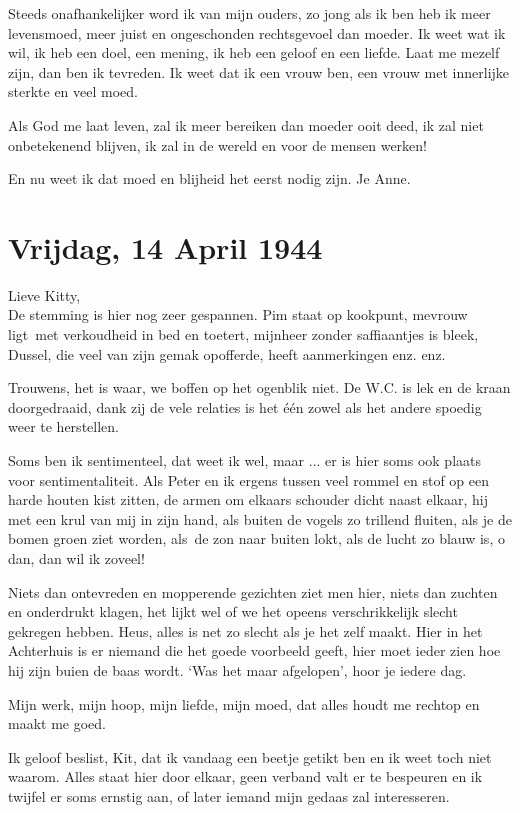 \documentclass{book}
\begin{document}
Steeds onafhankelijker word ik van mijn ouders, zo jong als ik ben heb ik meer
levensmoed, meer juist en ongeschonden rechtsgevoel dan moeder.  Ik weet wat ik
wil, ik heb een doel, een mening, ik heb een geloof en een liefde. Laat me
mezelf zijn, dan ben ik tevreden. Ik weet dat ik een vrouw ben, een vrouw met
innerlijke sterkte en veel moed.

Als God me laat leven, zal ik meer bereiken dan moeder ooit deed, ik zal niet
onbetekenend blijven, ik zal in de wereld en voor de mensen werken!

En nu weet ik dat moed en blijheid het eerst nodig zijn. Je Anne.

\section*{Vrijdag, 14 April 1944}

Lieve Kitty,\\
De stemming is hier nog zeer gespannen. Pim staat op kookpunt,
mevrouw ligt~met verkoudheid in bed en toetert, mijnheer zonder saffiaantjes is
bleek, Dussel, die veel van zijn gemak opofferde, heeft aanmerkingen enz. enz.

Trouwens, het is waar, we boffen op het ogenblik niet. De W.C. is lek en de
kraan doorgedraaid, dank zij de vele relaties is het één zowel als het andere
spoedig weer te herstellen.

Soms ben ik sentimenteel, dat weet ik wel, maar ... er is hier soms ook plaats
voor sentimentaliteit. Als Peter en ik ergens tussen veel rommel en stof op een
harde houten kist zitten, de armen om elkaars schouder dicht naast elkaar, hij
met een krul van mij in zijn hand, als buiten de vogels zo trillend fluiten, als
je de bomen groen ziet worden, als~de zon naar buiten lokt, als de lucht zo
blauw is, o dan, dan wil ik zoveel!

Niets dan ontevreden en mopperende gezichten ziet men hier, niets dan zuchten en
onderdrukt klagen, het lijkt wel of we het opeens verschrikkelijk slecht
gekregen hebben. Heus, alles is net zo slecht als je het zelf maakt. Hier in het
Achterhuis is er niemand die het goede voorbeeld geeft, hier moet ieder zien hoe
hij zijn buien de baas wordt.  `Was het maar afgelopen', hoor je iedere dag.

Mijn werk, mijn hoop, mijn liefde, mijn moed, dat alles houdt me rechtop en
maakt me goed.

Ik geloof beslist, Kit, dat ik vandaag een beetje getikt ben en ik weet toch
niet waarom. Alles staat hier door elkaar, geen verband valt er te bespeuren en
ik twijfel er soms ernstig aan, of later iemand mijn gedaas zal interesseren.
\end{document}
